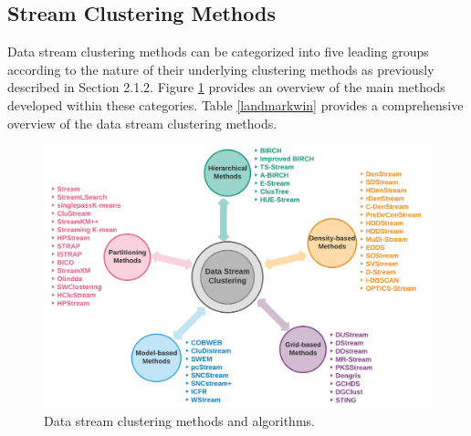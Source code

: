\hspace{1 cm}

\subsection{Stream Clustering Methods}

Data stream clustering methods can be categorized into five leading groups according to the nature of their underlying clustering methods as previously described in Section 2.1.2. Figure \ref{method} provides an overview of the main methods developed within these categories. Table \ref{landmarkwin} provides a comprehensive overview of the data stream clustering methods. 


\begin{figure}
\centering
\includegraphics[width = 12 cm]{image/Chapters/Chapter2/streammethod.png}
\caption{Data stream clustering methods and algorithms.}
\label{method}
\end{figure}







